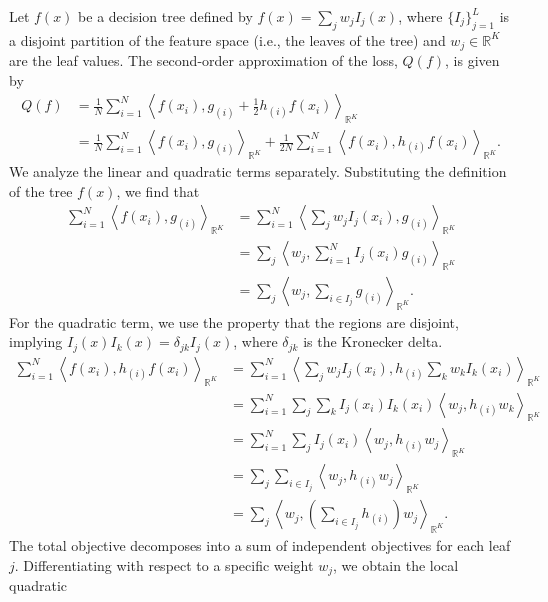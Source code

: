 \documentclass{article}
\theoremstyle{plain}
\theoremstyle{definition}
\theoremstyle{remark}
\begin{document}
Let $f(x)$ be a decision tree defined by $f(x) = \sum_j w_j I_j(x)$, where $\{I_j\}_{j=1}^L$ is a disjoint partition of the feature space (i.e., the leaves of the tree) and $w_j \in \mathbb{R}^K$ are the leaf values. The second-order approximation of the loss, $Q(f)$, is given by
\begin{align*}
    Q(f) 
    &=\frac{1}{N} \sum_{i=1}^N \left\langle f(x_i), g_{(i)} + \frac{1}{2} h_{(i)} f(x_i) \right\rangle_{\mathbb{R}^K} \\
    &= \frac{1}{N} \sum_{i=1}^N \left\langle f(x_i), g_{(i)} \right\rangle_{\mathbb{R}^K} + \frac{1}{2N} \sum_{i=1}^N \left\langle f(x_i), h_{(i)} f(x_i) \right\rangle_{\mathbb{R}^K}.
\end{align*}
We analyze the linear and quadratic terms separately. Substituting the definition of the tree $f(x)$, we find that
\begin{align*}
    \sum_{i=1}^N \left\langle f(x_i), g_{(i)} \right\rangle_{\mathbb{R}^K} 
    &= \sum_{i=1}^N \left\langle \sum_j w_j I_j(x_i), g_{(i)} \right\rangle_{\mathbb{R}^K}  \\
    &= \sum_j \left\langle w_j, \sum_{i=1}^N I_j(x_i) g_{(i)}\right\rangle_{\mathbb{R}^K} \\
    &= \sum_j \left\langle w_j, \sum_{i \in I_j} g_{(i)}\right\rangle_{\mathbb{R}^K}.
\end{align*}
For the quadratic term, we use the property that the regions are disjoint, implying $I_j(x)I_k(x) = \delta_{jk}I_j(x)$, where $\delta_{jk}$ is the Kronecker delta. 
\begin{align*}
    \sum_{i=1}^N \left\langle f(x_i), h_{(i)} f(x_i) \right\rangle_{\mathbb{R}^K} 
    &= \sum_{i=1}^N \left\langle \sum_j w_j I_j(x_i), h_{(i)} \sum_k w_k I_k(x_i) \right\rangle_{\mathbb{R}^K} \\
    &= \sum_{i=1}^N \sum_j \sum_k I_j(x_i) I_k(x_i) \left\langle w_j, h_{(i)} w_k \right\rangle_{\mathbb{R}^K} \\
    &= \sum_{i=1}^N \sum_j I_j(x_i) \left\langle w_j, h_{(i)} w_j \right\rangle_{\mathbb{R}^K} \\
    &= \sum_j \sum_{i \in I_j} \left\langle w_j, h_{(i)} w_j \right\rangle_{\mathbb{R}^K} \\
    &= \sum_j \left\langle w_j, \left( \sum_{i \in I_j} h_{(i)} \right) w_j \right\rangle_{\mathbb{R}^K}.
\end{align*}
The total objective decomposes into a sum of independent objectives for each leaf $j$. Differentiating with respect to a specific weight $w_j$, we obtain the local quadratic
\end{document}
